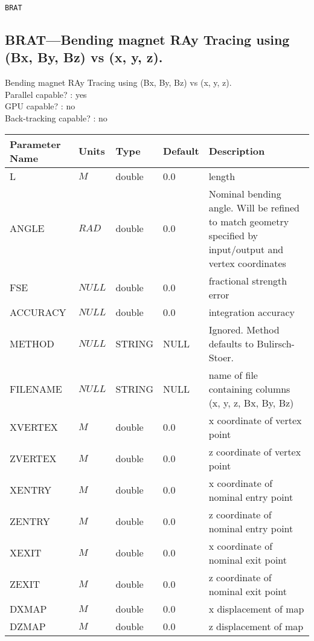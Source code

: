 \vspace*{0.5in}

\newpage
\begin{center}{\Large\verb|BRAT|}\end{center}
\subsection{BRAT---Bending magnet RAy Tracing using (Bx, By, Bz) vs (x, y, z).}
Bending magnet RAy Tracing using (Bx, By, Bz) vs (x, y, z).
\\
Parallel capable? : yes\\
GPU capable? : no\\
Back-tracking capable? : no\\
\begin{tabular}{|l|l|l|l|p{\descwidth}|} \hline
Parameter Name & Units & Type & Default & Description \\ \hline 
L & $M$ & double &  0.0 & length  \\ \hline 
ANGLE & $RAD$ & double &  0.0 & Nominal bending angle. Will be refined to match geometry specified by input/output and vertex coordinates  \\ \hline 
FSE & $NULL$ & double &  0.0 & fractional strength error  \\ \hline 
ACCURACY & $NULL$ & double &  0.0 & integration accuracy  \\ \hline 
METHOD & $NULL$ & STRING &   NULL            & Ignored. Method defaults to Bulirsch-Stoer.  \\ \hline 
FILENAME & $NULL$ & STRING &   NULL            & name of file containing columns (x, y, z, Bx, By, Bz)  \\ \hline 
XVERTEX & $M$ & double &  0.0 & x coordinate of vertex point  \\ \hline 
ZVERTEX & $M$ & double &  0.0 & z coordinate of vertex point  \\ \hline 
XENTRY & $M$ & double &  0.0 & x coordinate of nominal entry point  \\ \hline 
ZENTRY & $M$ & double &  0.0 & z coordinate of nominal entry point  \\ \hline 
XEXIT & $M$ & double &  0.0 & x coordinate of nominal exit point  \\ \hline 
ZEXIT & $M$ & double &  0.0 & z coordinate of nominal exit point  \\ \hline 
DXMAP & $M$ & double &  0.0 & x displacement of map  \\ \hline 
DZMAP & $M$ & double &  0.0 & z displacement of map  \\ \hline 

\end{tabular}
